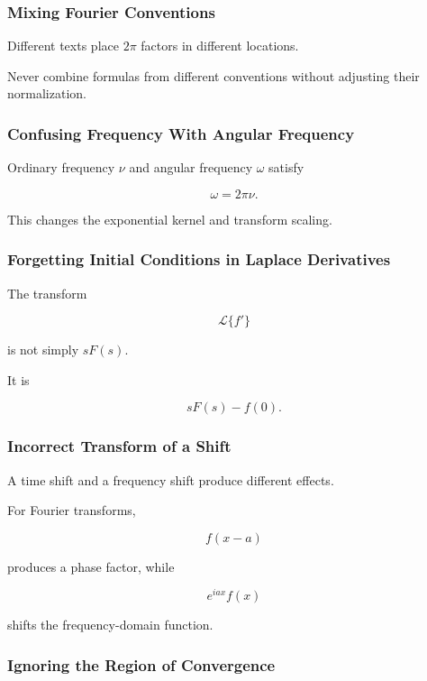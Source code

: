 \subsubsection{Mixing Fourier Conventions}

Different texts place \(2\pi\) factors in different locations.

Never combine formulas from different conventions without adjusting their
normalization.

\subsubsection{Confusing Frequency With Angular Frequency}

Ordinary frequency \(\nu\) and angular frequency \(\omega\) satisfy

\[
\boxed{
\omega
=
2\pi\nu.
}
\]

This changes the exponential kernel and transform scaling.

\subsubsection{Forgetting Initial Conditions in Laplace Derivatives}

The transform

\[
\mathcal{L}\{f'\}
\]

is not simply \(sF(s)\).

It is

\[
\boxed{
sF(s)-f(0).
}
\]

\subsubsection{Incorrect Transform of a Shift}

A time shift and a frequency shift produce different effects.

For Fourier transforms,

\[
f(x-a)
\]

produces a phase factor, while

\[
e^{iax}f(x)
\]

shifts the frequency-domain function.

\subsubsection{Ignoring the Region of Convergence}

